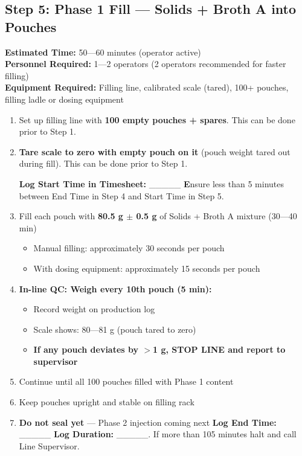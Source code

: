 {\subsection*{Step 5: Phase 1 Fill --- Solids + Broth A into Pouches}

\textbf{Estimated Time:} 50---60 minutes (operator active) \\
\textbf{Personnel Required:} 1---2 operators (2 operators recommended for faster filling) \\
\textbf{Equipment Required:} Filling line, calibrated scale (tared), 100+ pouches, filling ladle or dosing equipment

\begin{enumerate}[leftmargin=1.5em]
\item Set up filling line with \textbf{100 empty pouches + spares}. This can be done prior to Step 1. 
\item \textbf{Tare scale to zero with empty pouch on it} (pouch weight tared out during fill). This can be done prior to Step 1. 

\textbf{Log Start Time in Timesheet:} \_\_\_\_\_
\textbf Ensure less than 5 minutes between End Time in Step 4 and Start Time in Step 5. 
\item Fill each pouch with \textbf{80.5 g $\pm$ 0.5 g} of Solids + Broth A mixture (30---40 min)
  \begin{itemize}
  \item Manual filling: approximately 30 seconds per pouch
  \item With dosing equipment: approximately 15 seconds per pouch
  \end{itemize}
\item \textbf{In-line QC: Weigh every 10th pouch (5 min):}
  \begin{itemize}
  \item Record weight on production log
  \item Scale shows: 80---81 g (pouch tared to zero)
  \item \textbf{If any pouch deviates by $>$1 g, STOP LINE and report to supervisor}
  \end{itemize}
\item Continue until all 100 pouches filled with Phase 1 content
\item Keep pouches upright and stable on filling rack
\item \textbf{Do not seal yet} --- Phase 2 injection coming next
\textbf{Log End Time:} \_\_\_\_\_
\textbf{Log Duration:} \_\_\_\_\_. If more than 105 minutes halt and call Line Supervisor. 
\end{enumerate}

}
